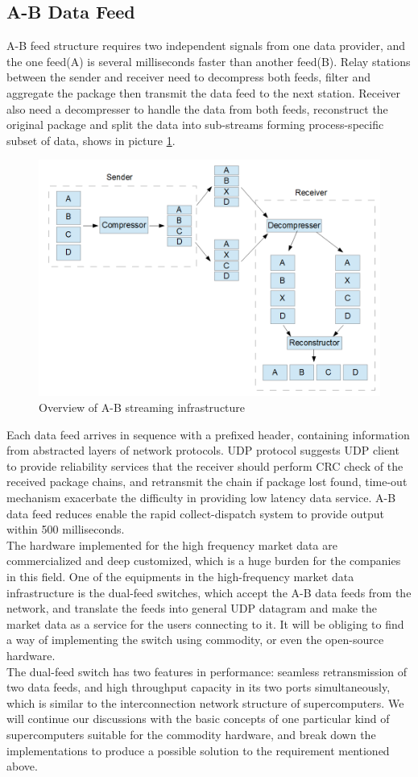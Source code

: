 \documentclass[11pt,openright,a4paper]{report}
\begin{document}
\subsection{A-B Data Feed}
A-B feed structure requires two independent signals from one data provider, and the one feed(A) is several milliseconds faster than another feed(B). Relay stations between the sender and receiver need to decompress both feeds, filter and aggregate the package then transmit the data feed to the next station. Receiver also need a decompresser to handle the data from both feeds, reconstruct the original package and split the data into sub-streams forming process-specific subset of data, shows in picture \ref{fig:3}.\\
\begin{figure}[H]
	\centering\includegraphics[width=0.7\linewidth]{picture/A-BFeed.PNG}
	\caption{Overview of A-B streaming infrastructure}
	\label{fig:3}
\end{figure}
Each data feed arrives in sequence with a prefixed header, containing information from abstracted layers of network protocols\cite{udpprotocol}. UDP protocol suggests UDP client to provide reliability services that the receiver should perform CRC check of the received package chains, and retransmit the chain if package lost found, time-out mechanism exacerbate the difficulty in providing low latency data service. A-B data feed reduces enable the rapid collect-dispatch system to provide output within 500 milliseconds\cite{zusman1999fault}.\\
The hardware implemented for the high frequency market data are commercialized and deep customized, which is a huge burden for the companies in this field. One of the equipments in the high-frequency market data infrastructure is the dual-feed switches, which accept the A-B data feeds from the network, and translate the feeds into general UDP datagram and make the market data as a service for the users connecting to it.  It will be obliging to find a way of implementing the switch using commodity, or even the open-source hardware.\\
The dual-feed switch has two features in performance: seamless retransmission of two data feeds, and high throughput capacity in its two ports simultaneously, which is similar to the interconnection network structure of supercomputers. We will continue our discussions with the basic concepts of one particular kind of supercomputers suitable for the commodity hardware, and break down the implementations to produce a possible solution to the requirement mentioned above.\\
\end{document}
